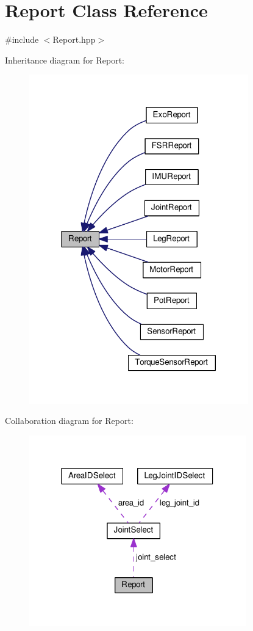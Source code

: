 \hypertarget{classReport}{}\section{Report Class Reference}
\label{classReport}


{\ttfamily \#include $<$Report.\+hpp$>$}



Inheritance diagram for Report\+:\nopagebreak
\begin{figure}[H]
\begin{center}
\leavevmode
\includegraphics[width=269pt]{classReport__inherit__graph}
\end{center}
\end{figure}


Collaboration diagram for Report\+:\nopagebreak
\begin{figure}[H]
\begin{center}
\leavevmode
\includegraphics[width=266pt]{classReport__coll__graph}
\end{center}
\end{figure}
